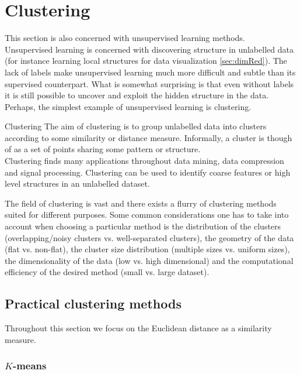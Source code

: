 \section{Clustering}
\label{sec:cluster}
This section is also concerned with unsupervised learning methods.\\
Unsupervised learning is concerned with discovering structure in unlabelled data (for instance learning local structures for data visualization \ref{sec:dimRed}). The lack of labels make unsupervised learning much more difficult and subtle than its supervised counterpart. What is somewhat surprising is that even without labels it is still possible to uncover and exploit the hidden structure in the data. Perhaps, the simplest example of unsupervised learning is clustering.
\begin{mybox}{Clustering}
 The aim of clustering is to group unlabelled data into clusters according to some similarity or distance measure. Informally, a cluster is though of as a set of points sharing some pattern or structure.\\
 Clustering finds many applications throughout data mining, data compression and signal processing. Clustering can be used to identify coarse features or high level structures in an unlabelled dataset.
\end{mybox}
The field of clustering is vast and there exists a flurry of clustering methods suited for different purposes. Some common considerations one has to take into account when choosing a particular method is the distribution of the clusters (overlapping/noisy clusters vs. well-separated clusters), the geometry of the data (flat vs. non-flat), the cluster size distribution (multiple sizes vs. uniform sizes), the dimensionality of the data (low vs. high dimensional) and the computational efficiency of the desired method (small vs. large dataset).


\subsection{Practical clustering methods}
\label{subsec:clusterPractical}
Throughout this section we focus on the Euclidean distance as a similarity measure.

\subsubsection{$K$-means}
\label{subsubsec:clusterPracticalKmeans}

